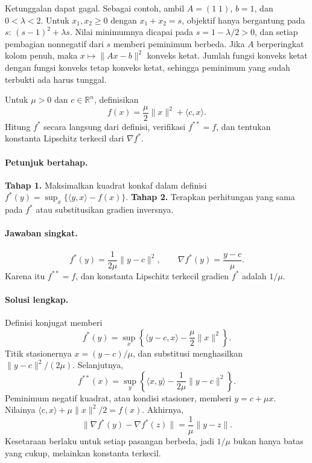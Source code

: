 Ketunggalan dapat gagal. Sebagai contoh, ambil
$A=(1\;1)$, $b=1$, dan $0<\lambda<2$. Untuk $x_1,x_2\ge0$ dengan
$x_1+x_2=s$, objektif hanya bergantung pada $s$:
$(s-1)^2+\lambda s$. Nilai minimumnya dicapai pada
$s=1-\lambda/2>0$, dan setiap pembagian nonnegatif dari $s$ memberi
peminimum berbeda. Jika $A$ berperingkat kolom penuh, maka
$x\mapsto\lVert Ax-b\rVert^2$ konveks ketat. Jumlah fungsi konveks ketat
dengan fungsi konveks tetap konveks ketat, sehingga peminimum yang sudah
terbukti ada harus tunggal.

\begin{exercise}
\label{orig03:midterm:exercise:0002}
Untuk $\mu>0$ dan $c\in\mathbb R^n$, definisikan
\[
 f(x)=\frac\mu2\lVert x\rVert^2+\langle c,x\rangle.
\]
Hitung $f^*$ secara langsung dari definisi, verifikasi $f^{**}=f$, dan
tentukan konstanta Lipschitz terkecil dari $\nabla f^*$.
\end{exercise}

\paragraph{Petunjuk bertahap.}
\label{orig03:midterm:hint:0002}
\textbf{Tahap 1.} Maksimalkan kuadrat konkaf dalam definisi
$f^*(y)=\sup_x\{\langle y,x\rangle-f(x)\}$.
\textbf{Tahap 2.} Terapkan perhitungan yang sama pada $f^*$ atau substitusikan
gradien inversnya.

\paragraph{Jawaban singkat.}
\label{orig03:midterm:answer:0002}
\[
 f^*(y)=\frac1{2\mu}\lVert y-c\rVert^2,
 \qquad
 \nabla f^*(y)=\frac{y-c}{\mu}.
\]
Karena itu $f^{**}=f$, dan konstanta Lipschitz terkecil gradien $f^*$ adalah
$1/\mu$.

\paragraph{Solusi lengkap.}
\label{orig03:midterm:solution:0002}
Definisi konjugat memberi
\[
 f^*(y)=\sup_x\left\{\langle y-c,x\rangle-\frac\mu2\lVert x\rVert^2\right\}.
\]
Titik stasionernya $x=(y-c)/\mu$, dan substitusi menghasilkan
$\lVert y-c\rVert^2/(2\mu)$. Selanjutnya,
\[
 f^{**}(x)=\sup_y\left\{\langle x,y\rangle
 -\frac1{2\mu}\lVert y-c\rVert^2\right\}.
\]
Peminimum negatif kuadrat, atau kondisi stasioner, memberi
$y=c+\mu x$. Nilainya
$\langle c,x\rangle+\mu\lVert x\rVert^2/2=f(x)$. Akhirnya,
\[
 \lVert\nabla f^*(y)-\nabla f^*(z)\rVert
 =\frac1\mu\lVert y-z\rVert.
\]
Kesetaraan berlaku untuk setiap pasangan berbeda, jadi $1/\mu$ bukan hanya
batas yang cukup, melainkan konstanta terkecil.

